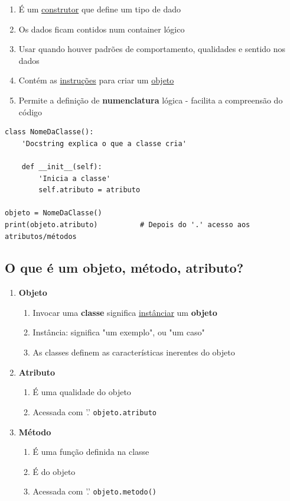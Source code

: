 \documentclass[presentation]{beamer}
\begin{document}
\begin{enumerate}
\item É um \uline{construtor} que define um tipo de dado
\item Os dados ficam contidos num container lógico
\item Usar quando houver padrões de comportamento, qualidades e sentido nos dados
\item Contém as \uline{instruções} para criar um \uline{objeto}
\item Permite a definição de \textbf{numenclatura} lógica - facilita a compreensão do código
\end{enumerate}

\begin{verbatim}
class NomeDaClasse():
    'Docstring explica o que a classe cria'

    def __init__(self):
        'Inicia a classe'
        self.atributo = atributo

objeto = NomeDaClasse()
print(objeto.atributo)          # Depois do '.' acesso aos atributos/métodos
\end{verbatim}

\subsection{O que é um \textbf{objeto}, \textbf{método}, \textbf{atributo}?}
\label{sec:orgheadline46}

\begin{enumerate}
\item \textbf{Objeto}
\begin{enumerate}
\item Invocar uma \textbf{classe} significa \uline{instânciar} um \textbf{objeto}
\item Instância: significa "um exemplo", ou  "um caso"
\item As classes definem as características inerentes do objeto
\end{enumerate}
\item \textbf{Atributo}
\begin{enumerate}
\item É uma qualidade do objeto
\item Acessada com '.' \texttt{objeto.atributo}
\end{enumerate}
\item \textbf{Método}
\begin{enumerate}
\item É uma função definida na classe
\item É do objeto
\item Acessada com '.' \texttt{objeto.metodo()}
\end{enumerate}
\end{enumerate}
\end{document}

